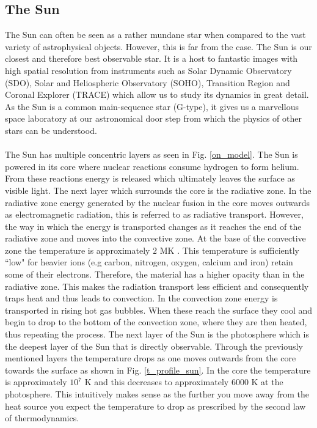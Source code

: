 \documentclass[12pt]{ociamthesis}
\begin{document}
\subsection{The Sun}
The Sun can often be seen as a rather mundane star when compared to the vast variety of astrophysical objects. However, this is far from the case. The Sun is our closest and therefore best observable star. It is a host to fantastic images with high spatial resolution from instruments such as Solar Dynamic Observatory (SDO), Solar and Heliospheric Observatory (SOHO), Transition Region and Coronal Explorer (TRACE) which allow us to study its dynamics in great detail. As the Sun is a common main-sequence star (G-type), it gives us a marvellous space laboratory at our astronomical door step from which the physics of other stars can be understood. \\ \\
The Sun has multiple concentric layers as seen in Fig. \ref{on_model}. The Sun is powered in its core where nuclear reactions consume hydrogen to form helium. From these reactions energy is released which ultimately leaves the surface as visible light. The next layer which surrounds the core is the radiative zone. In the radiative zone energy generated by the nuclear fusion in the core moves outwards as electromagnetic radiation, this is referred to as radiative transport. However, the way in which the energy is transported changes as it reaches the end of the radiative zone and moves into the convective zone. At the base of the convective zone the temperature is approximately $2$ MK \citep{mullan2009physics}. This temperature is sufficiently ``low" for heavier ions (e.g carbon, nitrogen, oxygen, calcium and iron) retain some of their electrons. Therefore, the material has a higher opacity than in the radiative zone. This makes the radiation transport less efficient and consequently traps heat and thus leads to convection. In the convection zone energy is transported in rising hot gas bubbles. When these reach the surface they cool and begin to drop to the bottom of the convection zone, where they are then heated, thus repeating the process. The next layer of the Sun is the photosphere which is the deepest layer of the Sun that is directly observable. Through the previously mentioned layers the temperature drops as one moves outwards from the core towards the surface as shown in Fig. \ref{t_profile_sun}. In the core the temperature is approximately $10^7$ K and this decreases to approximately $6000$ K at the photosphere. This intuitively makes sense as the further you move away from the heat source you expect the temperature to drop as prescribed by the second law of thermodynamics.
\end{document}
